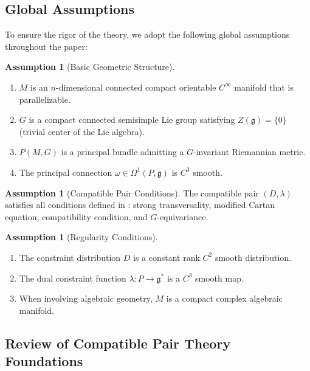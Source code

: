 \documentclass[a4paper,12pt]{extarticle}
\theoremstyle{plain}
\theoremstyle{definition}
\newtheorem{assumption}[theorem]{Assumption}
\begin{document}
\subsection{Global Assumptions}

To ensure the rigor of the theory, we adopt the following global assumptions throughout the paper:

\begin{assumption}[Basic Geometric Structure]
\label{ass:basic-geometry}
\begin{enumerate}
\item $M$ is an $n$-dimensional connected compact orientable $C^\infty$ manifold that is parallelizable.
\item $G$ is a compact connected semisimple Lie group satisfying $Z(\mathfrak{g}) = \{0\}$ (trivial center of the Lie algebra).
\item $P(M,G)$ is a principal bundle admitting a $G$-invariant Riemannian metric.
\item The principal connection $\omega \in \Omega^1(P,\mathfrak{g})$ is $C^3$ smooth.
\end{enumerate}
\end{assumption}

\begin{assumption}[Compatible Pair Conditions]
\label{ass:compatible-pair}
The compatible pair $(D,\lambda)$ satisfies all conditions defined in \cite{zheng2025dynamical}: strong transversality, modified Cartan equation, compatibility condition, and $G$-equivariance.
\end{assumption}

\begin{assumption}[Regularity Conditions]
\label{ass:regularity}
\begin{enumerate}
\item The constraint distribution $D$ is a constant rank $C^2$ smooth distribution.
\item The dual constraint function $\lambda: P \to \mathfrak{g}^*$ is a $C^3$ smooth map.
\item When involving algebraic geometry, $M$ is a compact complex algebraic manifold.
\end{enumerate}
\end{assumption}

\subsection{Review of Compatible Pair Theory Foundations}
\end{document}
